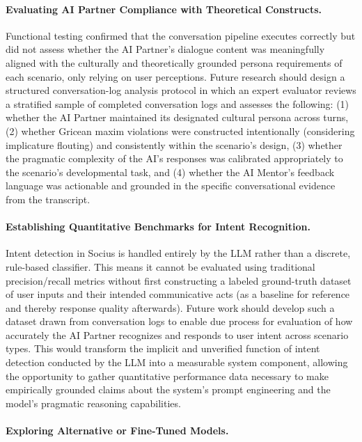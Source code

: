 \paragraph{Evaluating AI Partner Compliance with Theoretical Constructs.}

Functional testing confirmed that the conversation pipeline executes correctly but
did not assess whether the AI Partner's dialogue content was meaningfully aligned
with the culturally and theoretically grounded persona requirements of each
scenario, only relying on user perceptions. Future research should design a structured 
conversation-log analysis protocol in which an expert evaluator reviews a stratified sample
of completed conversation logs and assesses the following: (1) whether the AI Partner maintained its
designated cultural persona across turns, (2) whether Gricean maxim violations
were constructed intentionally (considering implicature flouting) and consistently within the scenario's design,
(3) whether the pragmatic complexity of the AI's responses was calibrated
appropriately to the scenario's developmental task, and (4) whether the AI
Mentor's feedback language was actionable and grounded in the specific
conversational evidence from the transcript.

\paragraph{Establishing Quantitative Benchmarks for Intent Recognition.}

Intent detection in Socius is handled entirely by the LLM rather than 
a discrete, rule-based classifier. This means it cannot be evaluated using traditional 
precision/recall metrics without first constructing a labeled ground-truth dataset 
of user inputs and their intended communicative acts (as a baseline for reference and thereby response quality afterwards). 
Future work should develop such a dataset drawn from conversation logs to enable due process for 
evaluation of how accurately the AI Partner recognizes and responds to user intent 
across scenario types. This would transform the implicit and unverified function of intent detection conducted by the 
LLM into a measurable system component, allowing the opportunity to gather quantitative performance data necessary to make empirically 
grounded claims about the system's prompt engineering and the model's pragmatic reasoning capabilities.

\paragraph{Exploring Alternative or Fine-Tuned Models.}

